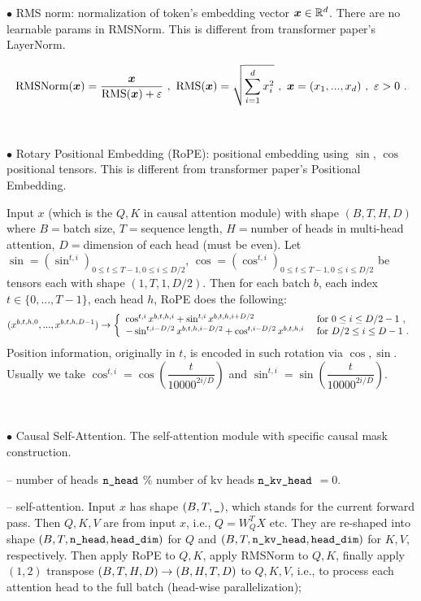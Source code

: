
$\bullet$ RMS norm: normalization of token's embedding vector $\boldsymbol{x} \in \mathbb R^d$. There are no learnable params in RMSNorm. This is different from transformer paper's LayerNorm.

$$\text{RMSNorm}(\boldsymbol{x})=\dfrac{\boldsymbol{x}}{\text{RMS}(\boldsymbol{x})+\varepsilon} \ , \ \text{RMS}(\boldsymbol{x})=\sqrt{\sum\limits_{i=1}^d x_i^2} \ , \ \boldsymbol{x} = (x_1,...,x_d) \ , \ \varepsilon>0 \ .$$

\

$\bullet$ Rotary Positional Embedding (RoPE): positional embedding using $\sin$, $\cos$ positional tensors. This is different from transformer paper's Positional Embedding.

Input $x$ (which is the $Q,K$ in causal attention module) with shape $(B, T, H, D)$ where  $B=$batch size, $T=$sequence length, $H=$number of heads in multi-head attention, $D=$dimension of each head (must be even). Let $\sin=(\sin^{t,i})_{0\leq t \leq T-1, 0\leq i\leq D/2}$, $\cos=(\cos^{t,i})_{0\leq t \leq T-1, 0\leq i\leq D/2}$ be tensors each with shape $(1,T,1,D/2)$. Then for each batch $b$, each index $t\in \{0,...,T-1\}$, each head $h$, RoPE does the following:
$$(x^{b,t,h,0},...,x^{b,t,h,D-1}) \rightarrow \left\{\begin{array}{ll}
\cos^{t,i}x^{b,t,h,i} + \sin^{t,i}x^{b,t,h,i+D/2} & \text{ for } 0\leq i \leq D/2-1 \ ,
\\
-\sin^{t,i-D/2}x^{b,t,h,i-D/2} + \cos^{t,i-D/2}x^{b,t,h,i} & \text{ for } D/2\leq i \leq D-1 \ .
\end{array}\right.$$
Position information, originally in $t$, is encoded in such rotation via $\cos, \sin$. Usually we take $\cos^{t,i}=\cos \left(\dfrac{t}{10000^{2i/D}}\right)$ and $\sin^{t,i}=\sin \left(\dfrac{t}{10000^{2i/D}}\right)$.

\

$\bullet$ Causal Self-Attention. The self-attention module with specific causal mask construction.

-- number of heads $\verb#n_head#$ $\%$ number of kv heads $\verb#n_kv_head#$ $=0$. 

-- self-attention. Input $x$ has shape $(B,T,\verb#_#)$, which stands for the current forward pass. Then $Q, K, V$ are from input $x$, i.e., $Q=W_Q^T X$ etc. They are re-shaped into shape $(B,T, \verb#n_head#, \verb#head_dim#)$ for $Q$ and $(B,T, \verb#n_kv_head#, \verb#head_dim#)$ for $K, V$, respectively. 
Then apply RoPE to $Q,K$, apply RMSNorm to $Q,K$, finally apply $(1,2)$ transpose $(B,T,H,D)\rightarrow (B,H,T,D)$ to $Q,K,V$, i.e., to process each attention head to the full batch (head-wise parallelization);

